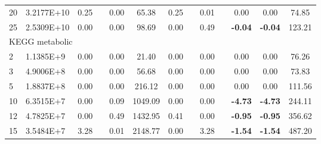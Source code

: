 {\begin{longtable}{@{}llccccccccccc@{}}
\multicolumn{1}{l|}{20} & \multicolumn{1}{l|}{3.2177E+10} & 0.25 & \multicolumn{1}{c|}{}    & 0.00 & \multicolumn{1}{c|}{65.38}    & 0.25 & \multicolumn{1}{c|}{}    & 0.01 & \multicolumn{1}{c|}{}    & 0.00            & 0.00            & 74.85   \\
\multicolumn{1}{l|}{25} & \multicolumn{1}{l|}{2.5309E+10} & 0.00 & \multicolumn{1}{c|}{}    & 0.00 & \multicolumn{1}{c|}{98.69}    & 0.00 & \multicolumn{1}{c|}{}    & 0.49 & \multicolumn{1}{c|}{}    & \textbf{-0.04}  & \textbf{-0.04}  & 123.21  \\ \hline
\multicolumn{13}{l}{KEGG metabolic}                                                                                                                                                                                                                  \\ \hline
\multicolumn{1}{l|}{2}  & \multicolumn{1}{l|}{1.1385E+9}  & 0.00 & \multicolumn{1}{c|}{}    & 0.00 & \multicolumn{1}{c|}{21.40}    & 0.00 & \multicolumn{1}{c|}{}    & 0.00 & \multicolumn{1}{c|}{}    & 0.00            & 0.00            & 76.26   \\
\multicolumn{1}{l|}{3}  & \multicolumn{1}{l|}{4.9006E+8}  & 0.00 & \multicolumn{1}{c|}{}    & 0.00 & \multicolumn{1}{c|}{56.68}    & 0.00 & \multicolumn{1}{c|}{}    & 0.00 & \multicolumn{1}{c|}{}    & 0.00            & 0.00            & 73.83   \\
\multicolumn{1}{l|}{5}  & \multicolumn{1}{l|}{1.8837E+8}  & 0.00 & \multicolumn{1}{c|}{}    & 0.00 & \multicolumn{1}{c|}{216.12}   & 0.00 & \multicolumn{1}{c|}{}    & 0.00 & \multicolumn{1}{c|}{}    & 0.00            & 0.00            & 111.56  \\
\multicolumn{1}{l|}{10} & \multicolumn{1}{l|}{6.3515E+7}  & 0.00 & \multicolumn{1}{c|}{}    & 0.09 & \multicolumn{1}{c|}{1049.09}  & 0.00 & \multicolumn{1}{c|}{}    & 0.00 & \multicolumn{1}{c|}{}    & \textbf{-4.73}  & \textbf{-4.73}  & 244.11  \\
\multicolumn{1}{l|}{12} & \multicolumn{1}{l|}{4.7825E+7}  & 0.00 & \multicolumn{1}{c|}{}    & 0.49 & \multicolumn{1}{c|}{1432.95}  & 0.41 & \multicolumn{1}{c|}{}    & 0.00 & \multicolumn{1}{c|}{}    & \textbf{-0.95}  & \textbf{-0.95}  & 356.62  \\
\multicolumn{1}{l|}{15} & \multicolumn{1}{l|}{3.5484E+7}  & 3.28 & \multicolumn{1}{c|}{}    & 0.01 & \multicolumn{1}{c|}{2148.77}  & 0.00 & \multicolumn{1}{c|}{}    & 3.28 & \multicolumn{1}{c|}{}    & \textbf{-1.54}  & \textbf{-1.54}  & 487.20  \\

\end{longtable}}
